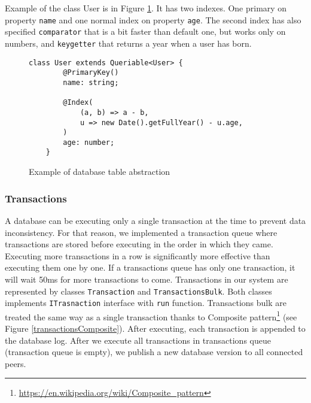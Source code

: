 Example of the class User is in Figure \ref{classExample}. It has two indexes. One primary on property \texttt{name} and one normal index on property \texttt{age}. The second index has also specified \texttt{comparator} that is a bit faster than default one, but works only on numbers, and \texttt{keygetter} that returns a year when a user has born. 

\begin{figure}[h]
    \centering
    \begin{lstlisting}[style=ES6]
    class User extends Queriable<User> {
        @PrimaryKey()
        name: string;

        @Index(
            (a, b) => a - b,
            u => new Date().getFullYear() - u.age,
        )
        age: number;
    }
    \end{lstlisting}
    \caption{Example of database table abstraction }
    \label{classExample}
\end{figure}



\subsubsection{Transactions}
A database can be executing only a single transaction at the time to prevent data inconsistency. For that reason, we implemented a transaction queue where transactions are stored before executing in the order in which they came. Executing more transactions in a row is significantly more effective than executing them one by one. If a transactions queue has only one transaction, it will wait 50ms for more transactions to come. Transactions in our system are represented by classes \texttt{Transaction} and \texttt{TransactionsBulk}. Both classes implements \texttt{ITrasnaction} interface with \texttt{run} function. Transactions bulk are treated the same way as a single transaction thanks to Composite pattern\footnote{\url{https://en.wikipedia.org/wiki/Composite_pattern}} (see Figure \ref{transactionsComposite}). After executing, each transaction is appended to the database log. After we execute all transactions in transactions queue (transaction queue is empty), we publish a new database version to all connected peers.


